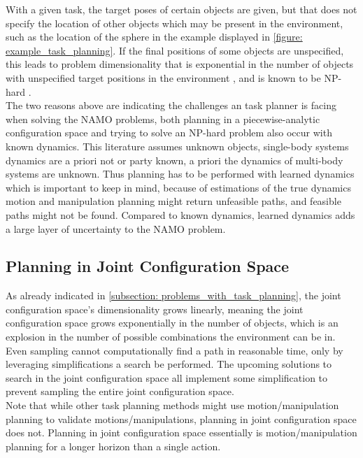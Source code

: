 With a given task, the target poses of certain objects are given, but that does not specify the location of other objects which may be present in the environment, such as the location of the sphere in the example displayed in \cref{figure: example_task_planning}. If the final positions of some objects are unspecified, this leads to problem dimensionality that is exponential in the number of objects with unspecified target positions in the environment \cite{scholz_navigation_2016}, and is known to be NP-hard \cite{reif_motion_1985}.\\

The two reasons above are indicating the challenges an task planner is facing when solving the \ac{NAMO} problems, both planning in a piecewise-analytic configuration space and trying to solve an NP-hard problem also occur with known dynamics. This literature assumes unknown objects, single-body systems dynamics are a priori not or party known, a priori the dynamics of multi-body systems are unknown. Thus planning has to be performed with learned dynamics which is important to keep in mind, because of estimations of the true dynamics motion and manipulation planning might return unfeasible paths, and feasible paths might not be found. Compared to known dynamics, learned dynamics adds a large layer of uncertainty to the \ac{NAMO} problem.\\

\subsection{Planning in Joint Configuration Space}
\label{subsection: planning_in_joint_config}
As already indicated in \cref{subsection: problems_with_task_planning}, the joint configuration space's dimensionality grows linearly, meaning the joint configuration space grows exponentially in the number of objects, which is an explosion in the number of possible combinations the environment can be in. Even sampling cannot computationally find a path in reasonable time, only by leveraging simplifications a search be performed. The upcoming solutions to search in the joint configuration space all implement some simplification to prevent sampling the entire joint configuration space. \\

Note that while other task planning methods might use motion/manipulation planning to validate motions/manipulations, planning in joint configuration space does not. Planning in joint configuration space essentially is motion/manipulation planning for a longer horizon than a single action.\\

